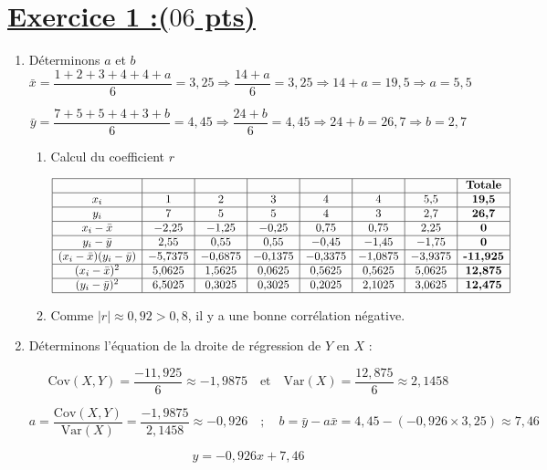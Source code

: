 \documentclass[12pt,a4paper]{article}
\begin{document}
\section*{\underline{Exercice 1 :($06$ pts)}}
\begin{enumerate}
\item Déterminons $a$ et $b$
\[
\bar{x} = \frac{1 + 2 + 3 + 4 + 4 + a}{6} = 3{,}25 
\Rightarrow \frac{14 + a}{6} = 3{,}25 
\Rightarrow 14 + a = 19{,}5 
\Rightarrow a = 5{,}5
\]

\[
\bar{y} = \frac{7 + 5 + 5 + 4 + 3 + b}{6} = 4{,}45 
\Rightarrow \frac{24 + b}{6} = 4{,}45 
\Rightarrow 24 + b = 26{,}7 
\Rightarrow b = 2{,}7
\]

\begin{enumerate}
    \item Calcul du coefficient \( r \)

\[
\begin{array}{|c|c|c|c|c|c|c|c|}
\hline
&  &  &  &  &  &  & \textbf{Totale} \\
\hline
x_i & 1 & 2 & 3 & 4 & 4 & 5{,}5 & \textbf{19{,}5} \\
\hline
y_i & 7 & 5 & 5 & 4 & 3 & 2{,}7 & \textbf{26{,}7} \\
\hline
x_i - \bar{x} & -2{,}25 & -1{,}25 & -0{,}25 & 0{,}75 & 0{,}75 & 2{,}25 & \textbf{0} \\
\hline
y_i - \bar{y} & 2{,}55 & 0{,}55 & 0{,}55 & -0{,}45 & -1{,}45 & -1{,}75 & \textbf{0} \\
\hline
(x_i - \bar{x})(y_i - \bar{y}) & -5{,}7375 & -0{,}6875 & -0{,}1375 & -0{,}3375 & -1{,}0875 & -3{,}9375 & \textbf{-11{,}925} \\
\hline
(x_i - \bar{x})^2 & 5{,}0625 & 1{,}5625 & 0{,}0625 & 0{,}5625 & 0{,}5625 & 5{,}0625 & \textbf{12{,}875} \\
\hline
(y_i - \bar{y})^2 & 6{,}5025 & 0{,}3025 & 0{,}3025 & 0{,}2025 & 2{,}1025 & 3{,}0625 & \textbf{12{,}475} \\
\hline
\end{array}
\]

\item Comme \( |r| \approx 0{,}92 > 0{,}8 \), il y a une bonne corrélation négative.
\end{enumerate}

\item Déterminons l'équation de la droite de régression de \( Y \) en \( X \) :

\[
\text{Cov}(X,Y) = \frac{-11{,}925}{6} \approx -1{,}9875
\quad \text{et} \quad 
\text{Var}(X) = \frac{12{,}875}{6} \approx 2{,}1458
\]

\[
a = \frac{\text{Cov}(X,Y)}{\text{Var}(X)} = \frac{-1{,}9875}{2{,}1458} \approx -0{,}926
\quad ; \quad 
b = \bar{y} - a \bar{x} = 4{,}45 - (-0{,}926 \times 3{,}25) \approx 7{,}46
\]

\[
\boxed{y = -0{,}926x + 7{,}46}
\]
\end{enumerate}
\end{document}
